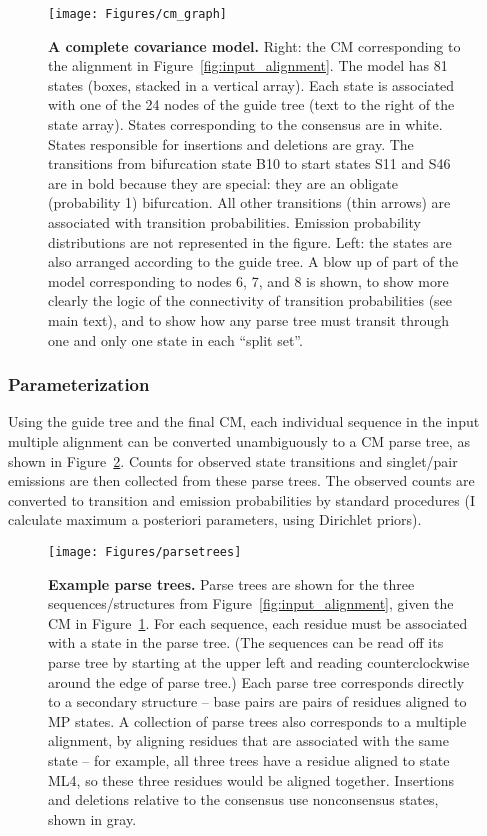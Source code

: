 \documentclass[11pt]{article}
\begin{document}
\begin{figure}[tp]
\begin{center}
\texttt{[image: Figures/cm\_graph]}
\end{center}
\caption{\textbf{A complete covariance model.} Right: the CM
corresponding to the alignment in Figure~\ref{fig:input_alignment}.
The model has 81 states (boxes, stacked in a vertical array). Each
state is associated with one of the 24 nodes of the guide tree (text
to the right of the state array). States corresponding to the
consensus are in white. States responsible for insertions and
deletions are gray. The transitions from bifurcation state B10 to
start states S11 and S46 are in bold because they are special: they
are an obligate (probability 1) bifurcation. All other transitions
(thin arrows) are associated with transition probabilities.  Emission
probability distributions are not represented in the figure. Left: the
states are also arranged according to the guide tree. A blow up of
part of the model corresponding to nodes 6, 7, and 8 is shown, to show
more clearly the logic of the connectivity of transition probabilities
(see main text), and to show how any parse tree must transit through
one and only one state in each ``split set''.}
\label{fig:cm_graph}
\end{figure}

\subsubsection{Parameterization}

Using the guide tree and the final CM, each individual sequence in the
input multiple alignment can be converted unambiguously to a CM parse
tree, as shown in Figure~\ref{fig:parsetrees}. Counts for observed
state transitions and singlet/pair emissions are then collected from
these parse trees. The observed counts are converted to transition and
emission probabilities by standard procedures (I calculate maximum a
posteriori parameters, using Dirichlet priors).

\begin{figure}[t]
\begin{center}
\texttt{[image: Figures/parsetrees]}
\end{center}
\caption{\textbf{Example parse trees.} Parse trees are shown for the
three sequences/structures from Figure~\ref{fig:input_alignment},
given the CM in Figure~\ref{fig:cm_graph}. For each sequence, each
residue must be associated with a state in the parse tree. (The
sequences can be read off its parse tree by starting at the upper left
and reading counterclockwise around the edge of parse tree.) Each
parse tree corresponds directly to a secondary structure -- base pairs
are pairs of residues aligned to MP states. A collection of parse
trees also corresponds to a multiple alignment, by aligning residues
that are associated with the same state -- for example, all three
trees have a residue aligned to state ML4, so these three residues
would be aligned together. Insertions and deletions relative to the
consensus use nonconsensus states, shown in gray.}
\label{fig:parsetrees}
\end{figure}
\end{document}
